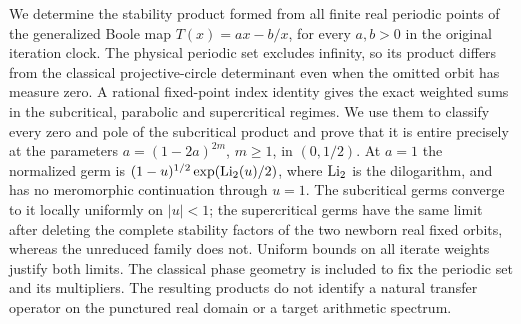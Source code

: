 We determine the stability product formed from all finite real periodic points
of the generalized Boole map $T(x)=ax-b/x$, for every $a,b>0$ in the original
iteration clock. The physical periodic set excludes infinity, so its product
differs from the classical projective-circle determinant even when the omitted
orbit has measure zero. A rational fixed-point index identity gives the exact
weighted sums in the subcritical, parabolic and supercritical regimes. We use
them to classify every zero and pole of the subcritical product and prove that
it is entire precisely at the parameters
$a=(1-2a)^{2m}$, $m\ge1$, in $(0,1/2)$. At $a=1$ the normalized germ is
$(1-u)^{1/2}\exp(\operatorname{Li}_2(u)/2)$, where $\operatorname{Li}_2$ is the dilogarithm, and has no
meromorphic continuation through $u=1$.
The subcritical germs converge to it locally uniformly on $|u|<1$; the
supercritical germs have the same limit after deleting the complete
stability factors of the two newborn real fixed orbits, whereas the unreduced
family does not. Uniform bounds on all
iterate weights justify both limits. The classical phase geometry is included
to fix the periodic set and its multipliers. The resulting products do not
identify a natural transfer operator on the punctured real domain or a target
arithmetic spectrum.
